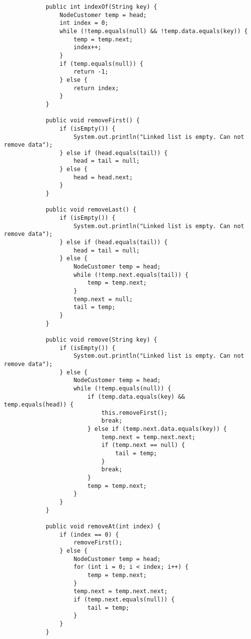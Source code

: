 \documentclass[12pt,titlepage]{article}
\begin{document}
\begin{enumerate}
\begin{verbatim}
            public int indexOf(String key) {
                NodeCustomer temp = head;
                int index = 0;
                while (!temp.equals(null) && !temp.data.equals(key)) {
                    temp = temp.next;
                    index++;
                }
                if (temp.equals(null)) {
                    return -1;
                } else {
                    return index;
                }
            }

            public void removeFirst() {
                if (isEmpty()) {
                    System.out.println("Linked list is empty. Can not remove data");
                } else if (head.equals(tail)) {
                    head = tail = null;
                } else {
                    head = head.next;
                }
            }

            public void removeLast() {
                if (isEmpty()) {
                    System.out.println("Linked list is empty. Can not remove data");
                } else if (head.equals(tail)) {
                    head = tail = null;
                } else {
                    NodeCustomer temp = head;
                    while (!temp.next.equals(tail)) {
                        temp = temp.next;
                    }
                    temp.next = null;
                    tail = temp;
                }
            }

            public void remove(String key) {
                if (isEmpty()) {
                    System.out.println("Linked list is empty. Can not remove data");
                } else {
                    NodeCustomer temp = head;
                    while (!temp.equals(null)) {
                        if (temp.data.equals(key) && temp.equals(head)) {
                            this.removeFirst();
                            break;
                        } else if (temp.next.data.equals(key)) {
                            temp.next = temp.next.next;
                            if (temp.next == null) {
                                tail = temp;
                            }
                            break;
                        }
                        temp = temp.next;
                    }
                }
            }

            public void removeAt(int index) {
                if (index == 0) {
                    removeFirst();
                } else {
                    NodeCustomer temp = head;
                    for (int i = 0; i < index; i++) {
                        temp = temp.next;
                    }
                    temp.next = temp.next.next;
                    if (temp.next.equals(null)) {
                        tail = temp;
                    }
                }
            }


\end{verbatim}
\end{enumerate}
\end{document}
